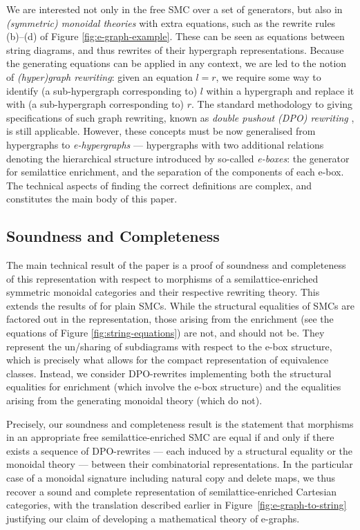 We are interested not only in the free SMC over a set of generators, but also in \textit{(symmetric) monoidal theories} with extra equations, such as the rewrite rules (b)--(d) of Figure \ref{fig:e-graph-example}. 
These can be seen as equations between string diagrams, and thus rewrites of their hypergraph representations.  
Because the generating equations can be applied in any context, we are led to the notion of \textit{(hyper)graph rewriting}: given an equation $l=r$, we require some way to identify (a sub-hypergraph corresponding to) $l$ within a hypergraph and replace it with (a sub-hypergraph corresponding to) $r$.
The standard methodology to giving specifications of such graph rewriting, known as \textit{double pushout (DPO) rewriting} \cite{dpo, bonchi_string_2022-1}, is still applicable.
However, these concepts must be now generalised from hypergraphs to \textit{e-hypergraphs} --- hypergraphs with two additional relations denoting the hierarchical structure introduced by so-called \textit{e-boxes}: the generator for semilattice enrichment, and the separation of the components of each e-box.
The technical aspects of finding the correct definitions are complex, and constitutes the main body of this paper. 

\subsection{Soundness and Completeness}
The main technical result of the paper is a proof of soundness and completeness of this representation with respect to morphisms of a semilattice-enriched symmetric monoidal categories and their respective rewriting theory.
This extends the results of \cite{bonchi_string_2022-2} for plain SMCs. 
While the structural equalities of SMCs are factored out in the representation,  those arising from the enrichment (see the equations of Figure \ref{fig:string-equations}) are not, and should not be. 
They represent the un/sharing of subdiagrams with respect to the e-box structure,  which is precisely what allows for the compact representation of equivalence classes.  
Instead, we consider DPO-rewrites implementing both the structural equalities for enrichment (which involve the e-box structure) and the equalities arising from the generating monoidal theory (which do not).  

Precisely,  our soundness and completeness result is the statement that morphisms in an appropriate free semilattice-enriched SMC are equal  if and only if there exists a sequence of DPO-rewrites --- each induced by a structural equality or the monoidal theory --- between their combinatorial representations. 
In the particular case of a monoidal signature including natural copy and delete maps,  we thus recover a sound and complete representation of semilattice-enriched Cartesian categories,  with the translation described earlier in Figure~\ref{fig:e-graph-to-string} justifying our claim of developing a mathematical theory of e-graphs. 

